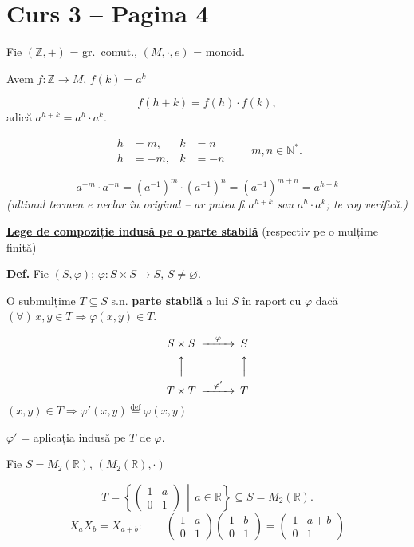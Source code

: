 \documentclass[12pt]{article}
\begin{document}
\section*{Curs 3 -- Pagina 4}

\noindent Fie $(\mathbb{Z},+)$ = gr.\ comut., $(M,\cdot,e)$ = monoid.

\noindent Avem $f : \mathbb{Z} \to M$, $f(k) = a^k$

\[
f(h+k) = f(h)\cdot f(k),
\]
adică $a^{h+k} = a^h \cdot a^k$.

\[
\begin{aligned}
h&=m, & k&=n\\
h&=-m, & k&=-n
\end{aligned}
\qquad m,n\in\mathbb{N}^*.
\]

\[
a^{-m}\cdot a^{-n} = (a^{-1})^{m}\cdot(a^{-1})^{n} = (a^{-1})^{m+n} = a^{h+k}
\]
\noindent\textit{(ultimul termen e neclar în original -- ar putea fi $a^{h+k}$ sau $a^h\cdot a^k$; te rog verifică.)}

\bigskip
\noindent\underline{\textbf{Lege de compoziție indusă pe o parte stabilă}} (respectiv pe o mulțime finită)

\bigskip
\noindent\textbf{Def.} Fie $(S,\varphi)$; $\varphi : S\times S \to S$, $S \neq \varnothing$.

\noindent O submulțime $T \subseteq S$ s.n. \textbf{parte stabilă} a lui $S$ în raport cu $\varphi$ dacă $(\forall)\, x,y \in T \Rightarrow \varphi(x,y) \in T$.

\[
\begin{CD}
S\times S @>\varphi>> S\\
@AAA @AAA\\
T\times T @>\varphi'>> T
\end{CD}
\]
\noindent $(x,y)\in T \Rightarrow \varphi'(x,y) \overset{\text{def}}{=} \varphi(x,y)$

\noindent $\varphi'$ = aplicația indusă pe $T$ de $\varphi$.

\noindent Fie $S = M_2(\mathbb{R})$, $(M_2(\mathbb{R}),\cdot)$

\[
T = \left\{ \begin{pmatrix} 1 & a \\ 0 & 1 \end{pmatrix} \,\middle|\, a\in\mathbb{R} \right\} \subseteq S = M_2(\mathbb{R}).
\]
\[
X_a X_b = X_{a+b}: \qquad \begin{pmatrix}1 & a\\ 0 & 1\end{pmatrix}\begin{pmatrix}1 & b\\ 0 & 1\end{pmatrix} = \begin{pmatrix}1 & a+b\\ 0 & 1\end{pmatrix}
\]
\end{document}
